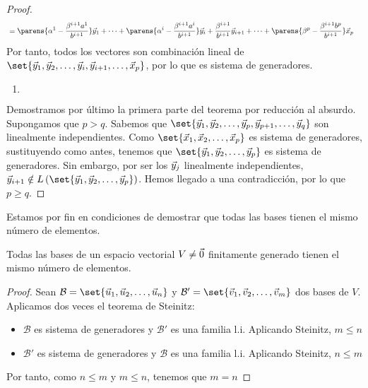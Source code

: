 \documentclass[../algebra_lineal.tex]{subfiles}
\begin{document}
\begin{proof}
\begin{align*}
            &= \parens{\alpha^1 - \frac{\beta^{i+1}a^1}{b^{i+1}}} \vy_1 + \dots + \parens{\alpha^i - \frac{\beta^{i+1}a^i}{b^{i+1}}}\vy_i + \frac{\beta^{i+1}}{b^{i+1}}\vy_{i+1} + \dots + \parens{\beta^p - \frac{\beta^{i+1}b^p}{b^{i+1}}}\vx_p
    \end{align*}
    Por tanto, todos los vectores son combinación lineal de $\set{\vy_1, \vy_2, \dots, \vy_{i}, \vy_{i+1}, \dots, \vx_p}$, por lo que es sistema de generadores.
    \begin{enumerate}[itemindent=21pt]
        \item[\hspace{20mm}\protect\fbox{Si $p < q$}] $ $ \linebreak
    \end{enumerate}
    Demostramos por último la primera parte del teorema por reducción al absurdo. Supongamos que $p > q$. Sabemos que $\set{\vlst{y}{p}, \vy_{p+1}, \dots, \vy_{q}}$ son linealmente independientes. Como $\set{\vlst{x}{p}}$ es sistema de generadores, sustituyendo como antes, tenemos que $\set{\vlst{y}{p}}$ es sistema de generadores.  Sin embargo, por ser los $\vec{y}_j$ linealmente independientes, $\vy_{i+1} \notin \lspan{\set{\vlst{y}{p}}}$. Hemos llegado a una contradicción, por lo que $p \ge q$.
\end{proof}

Estamos por fin en condiciones de demostrar que todas las bases tienen el mismo número de elementos.

\begin{corollary}
    Todas las bases de un espacio vectorial $V \ne {\vec{0}}$ finitamente generado tienen el mismo número de elementos.
\end{corollary}

\begin{proof}
    Sean $\mathcal{B} = \set{\vlst{u}{n}}$ y $\mathcal{B'} = \set{\vlst{v}{m}}$ dos bases de $V$. Aplicamos dos veces el teorema de Steinitz:
    \begin{itemize}
        \item $\mathcal{B}$ es sistema de generadores y $\mathcal{B'}$ es una familia l.i. Aplicando Steinitz, $m \le n$
        \item $\mathcal{B'}$ es sistema de generadores y $\mathcal{B}$ es una familia l.i. Aplicando Steinitz, $n \le m$
    \end{itemize}

    Por tanto, como $n \le m$ y $m \le n$, tenemos que $m = n$
\end{proof}
\end{document}
